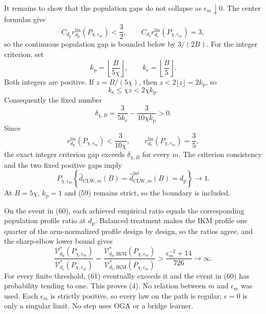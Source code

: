 It remains to show that the population gaps do not collapse as \(\epsilon_m\downarrow0\).  The center formulas give
\[
 C_{d_{\mathrm p}}r_{d_{\mathrm p}}^{\mathrm{lin}}(P_{\chi,\epsilon_m})<\frac32,
 \qquad
 C_{d_{\mathrm e}}r_{d_{\mathrm e}}^{\mathrm{lin}}(P_{\chi,\epsilon_m})=3, \tag{58}
\]
so the continuous population gap is bounded below by \(3/(2B)\).  For the integer criterion, set
\[
 k_{\mathrm p}=\left\lfloor\frac{B}{5\chi}\right\rfloor,
 \qquad
 k_{\mathrm e}=\left\lfloor\frac B5\right\rfloor.
\]
Both integers are positive.  If \(z=B/(5\chi)\), then \(z<2\lfloor z\rfloor=2k_{\mathrm p}\), so
\[
 k_{\mathrm e}\le\chi z<2\chi k_{\mathrm p}.
\]
Consequently the fixed number
\[
 \delta_{\chi,B}
 =\frac{3}{5k_{\mathrm e}}-
 \frac{3}{10\chi k_{\mathrm p}}>0.                        \tag{59}
\]
Since
\[
 r_{d_{\mathrm p}}^{\mathrm{lin}}(P_{\chi,\epsilon_m})
 <\frac3{10\chi},
 \qquad
 r_{d_{\mathrm e}}^{\mathrm{lin}}(P_{\chi,\epsilon_m})=\frac35,
\]
the exact integer criterion gap exceeds \(\delta_{\chi,B}\) for every \(m\).  The criterion consistency and the two fixed positive gaps imply
\[
 P_{\chi,\epsilon_m}\!\left\{
 \widehat d_{\mathrm{CLW},m}(B)
 =\widehat d_{\mathrm{CLW},m}^{\mathrm{int}}(B)
 =d_{\mathrm p}\right\}\longrightarrow1.                \tag{60}
\]
At \(B=5\chi\), \(k_{\mathrm p}=1\) and (59) remains strict, so the boundary is included.

On the event in (60), each achieved empirical ratio equals the corresponding population profile ratio at \(d_{\mathrm p}\).  Balanced treatment makes the IKM profile one quarter of the arm-normalized profile design by design, so the ratios agree, and the sharp-elbow lower bound gives
\[
 \frac{\mathcal V_{d_{\mathrm p}}^*(P_{\chi,\epsilon_m})}
 {\mathcal V_{d_{\mathrm e}}^*(P_{\chi,\epsilon_m})}
 =\frac{\mathcal V_{d_{\mathrm p},\mathrm{IKM}}^*(P_{\chi,\epsilon_m})}
 {\mathcal V_{d_{\mathrm e},\mathrm{IKM}}^*(P_{\chi,\epsilon_m})}
 >\frac{\epsilon_m^{-2}+14}{726}\longrightarrow\infty.  \tag{61}
\]
For every finite threshold, (61) eventually exceeds it and the event in (60) has probability tending to one.  This proves (4).  No relation between \(m\) and \(\epsilon_m\) was used.  Each \(\epsilon_m\) is strictly positive, so every law on the path is regular; \(\epsilon=0\) is only a singular limit.  No step uses OGA or a bridge learner.